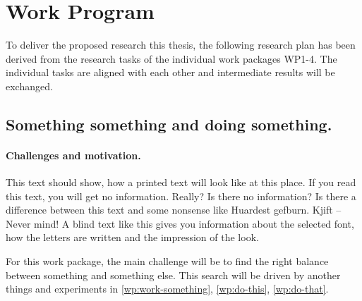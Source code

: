 \section{Work Program}
\label{sec-workprogram}
\let\oldthesubsection=\thesubsection
\def\thesubsection{WP\arabic{wp}}
\def\package#1{\addtocounter{wp}{1}\subsection{#1}}

\let\oldthesubsubsection=\thesubsubsection
\def\thesubsubsection{\thesubsection.\arabic{subsubsection}}
\let\task=\subsubsection

To deliver the proposed research this thesis, the following research plan has been derived from the research tasks of the individual work packages WP1-4. The individual tasks are aligned with each other and intermediate results will be exchanged.

\package{Something something and doing something.}
\label{wp:something}

\paragraph{Challenges and motivation.}
This text should show, how a printed text will look like at this place. If you read this text, you will get no information. Really? Is there no information? Is there a difference between this text and some nonsense like Huardest gefburn. Kjift – Never mind! A blind text like this gives you information about the
selected font, how the letters are written and the impression of the look.

\noindent For this work package, the main challenge will be to find the right balance between something and something else.  This search will be driven by another things and experiments in \ref{wp:work-something}, \ref{wp:do-this}, \ref{wp:do-that}.

